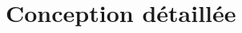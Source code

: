 \documentclass[a4paper,10pt]{report}
\begin{document}
\chapter{Conception détaillée}

    

%
%
%
%
%
%
%
%
%
%
\end{document}
